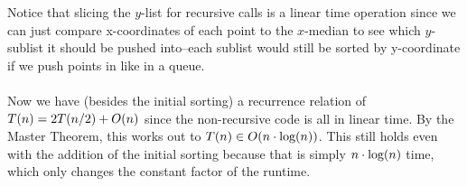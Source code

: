 \documentclass[11pt]{article}
\let\origleft\left
\let\origright\right
\renewcommand{\left}{\mathopen{}\mathclose\bgroup\origleft}
\renewcommand{\right}{\aftergroup\egroup\origright}
\newcommand{\p}[1]{\left(#1\right)}
\renewcommand{\log}[1]{\text{log}\p{#1}}
\newcommand{\BigOh}[1]{O\p{#1}}
\begin{document}
\begin{enumerate}[(a)]
Notice that slicing the $y$-list for recursive calls is a linear time operation since we can just compare x-coordinates of each point to the $x$-median to see which $y$-sublist it should be pushed into--each sublist would still be sorted by y-coordinate if we push points in like in a queue. \\\\
Now we have (besides the initial sorting) a recurrence relation of $T(n) = 2T(n/2)+\BigOh{n}$ since the non-recursive code is all in linear time. By the Master Theorem, this works out to $T(n) \in \BigOh{n\cdot\log n}$. This still holds even with the addition of the initial sorting because that is simply $n\cdot\log n$ time, which only changes the constant factor of the runtime.
\end{enumerate}
\end{document}
